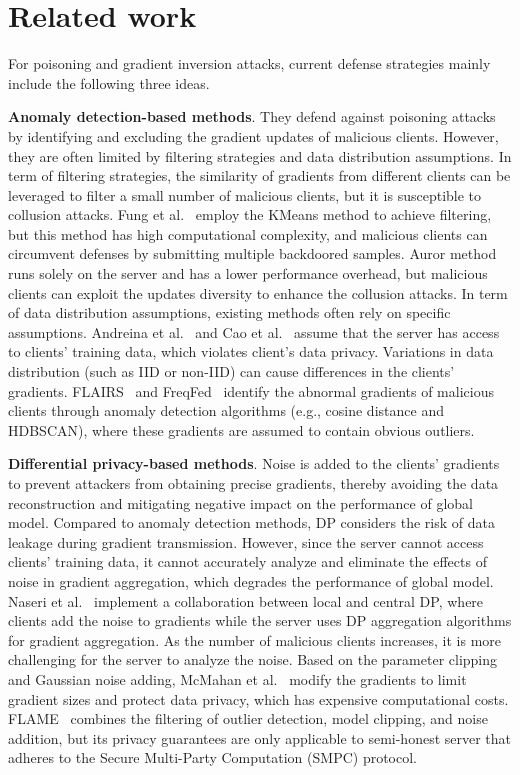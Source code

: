 \section{Related work}
\label{re}
For poisoning and gradient inversion attacks, current defense strategies mainly include the following three ideas.  

\textbf{Anomaly detection-based methods}. They defend against poisoning attacks by identifying and excluding the gradient updates of malicious clients. However, they are often limited by filtering strategies and data distribution assumptions. In term of filtering strategies, the similarity of gradients from different clients can be leveraged to filter a small number of malicious clients, but it is susceptible to collusion attacks. Fung et al.~\cite{fung2020limitations} employ the KMeans method to achieve filtering, but this method has high computational complexity, and malicious clients can circumvent defenses by submitting multiple backdoored samples. Auror method~\cite{shen2016auror} runs solely on the server and has a lower performance overhead, but malicious clients can exploit the updates diversity to enhance the collusion attacks. In term of data distribution assumptions, existing methods often rely on specific assumptions. Andreina et al.~\cite{9546463} and Cao et al.~\cite{cao2020fltrust} assume that the server has access to clients' training data, which violates client's data privacy. Variations in data distribution (such as IID or non-IID) can cause differences in the clients' gradients. FLAIRS~\cite{10296389} and FreqFed~\cite{Fereidooni2023FreqFedAF} identify the abnormal gradients of malicious clients through anomaly detection algorithms (e.g., cosine distance and HDBSCAN), where these gradients are assumed to contain obvious outliers. 

\textbf{Differential privacy-based methods}. Noise is added to the clients' gradients to prevent attackers from obtaining precise gradients, thereby avoiding the data reconstruction and mitigating negative impact on the performance of global model. Compared to anomaly detection methods, DP considers the risk of data leakage during gradient transmission. However, since the server cannot access clients' training data, it cannot accurately analyze and eliminate the effects of noise in gradient aggregation, which degrades the performance of global model. Naseri et al.~\cite{DBLP:journals/corr/abs-2009-03561} implement a collaboration between local and central DP, where clients add the noise to gradients while the server uses DP aggregation algorithms for gradient aggregation. As the number of malicious clients increases, it is more challenging for the server to analyze the noise. Based on the parameter clipping and Gaussian noise adding, McMahan et al.~\cite{DBLP:journals/corr/abs-1710-06963} modify the gradients to limit gradient sizes and protect data privacy, which has expensive computational costs. FLAME~\cite{nguyen2022flame} combines the filtering of outlier detection, model clipping, and noise addition, but its privacy guarantees are only applicable to semi-honest server that adheres to the Secure Multi-Party Computation (SMPC) protocol.


